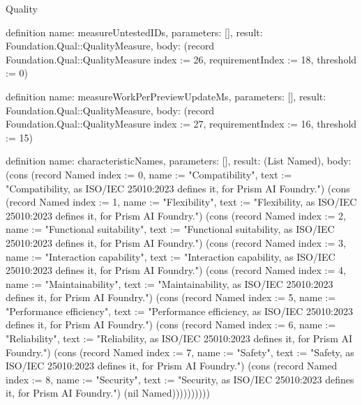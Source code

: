 \begin{lexlean}{Quality}
\begin{semanticmodule}
definition{
  name: measureUntestedIDs,
  parameters: [],
  result: Foundation.Qual::QualityMeasure,
  body: (record Foundation.Qual::QualityMeasure {index := 26, requirementIndex := 18, threshold := 0})
}

definition{
  name: measureWorkPerPreviewUpdateMs,
  parameters: [],
  result: Foundation.Qual::QualityMeasure,
  body: (record Foundation.Qual::QualityMeasure {index := 27, requirementIndex := 16, threshold := 15})
}

definition{
  name: characteristicNames,
  parameters: [],
  result: (List Named),
  body: (cons (record Named {index := 0, name := "Compatibility", text := "Compatibility, as ISO/IEC 25010:2023 defines it, for Prism AI Foundry."}) (cons (record Named {index := 1, name := "Flexibility", text := "Flexibility, as ISO/IEC 25010:2023 defines it, for Prism AI Foundry."}) (cons (record Named {index := 2, name := "Functional suitability", text := "Functional suitability, as ISO/IEC 25010:2023 defines it, for Prism AI Foundry."}) (cons (record Named {index := 3, name := "Interaction capability", text := "Interaction capability, as ISO/IEC 25010:2023 defines it, for Prism AI Foundry."}) (cons (record Named {index := 4, name := "Maintainability", text := "Maintainability, as ISO/IEC 25010:2023 defines it, for Prism AI Foundry."}) (cons (record Named {index := 5, name := "Performance efficiency", text := "Performance efficiency, as ISO/IEC 25010:2023 defines it, for Prism AI Foundry."}) (cons (record Named {index := 6, name := "Reliability", text := "Reliability, as ISO/IEC 25010:2023 defines it, for Prism AI Foundry."}) (cons (record Named {index := 7, name := "Safety", text := "Safety, as ISO/IEC 25010:2023 defines it, for Prism AI Foundry."}) (cons (record Named {index := 8, name := "Security", text := "Security, as ISO/IEC 25010:2023 defines it, for Prism AI Foundry."}) (nil Named))))))))))
}


\end{semanticmodule}
\end{lexlean}
